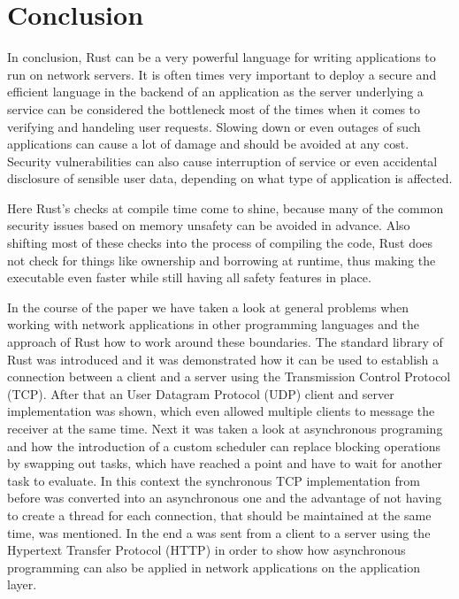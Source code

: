 
\section{Conclusion}
In conclusion, Rust can be a very powerful language for writing applications to run on network servers. It is often
times very important to deploy a secure and efficient language in the backend of an application as the server
underlying a service can be considered the bottleneck most of the times when it comes to verifying and handeling user
requests. Slowing down or even outages of such applications can cause a lot of damage and should be avoided at any
cost. Security vulnerabilities can also cause interruption of service or even accidental disclosure of sensible user
data, depending on what type of application is affected.

Here Rust's checks at compile time come to shine, because many of the common security issues based on memory unsafety
can be avoided in advance. Also shifting most of these checks into the process of compiling the code, Rust does not
check for things like ownership and borrowing at runtime, thus making the executable even faster while still having
all safety features in place.

In the course of the paper we have taken a look at general problems when working with network applications in other
programming languages and the approach of Rust how to work around these boundaries. The standard library of Rust was
introduced and it was demonstrated how it can be used to establish a connection between a client and a server using the
Transmission Control Protocol (TCP). After that an User Datagram Protocol (UDP) client and server implementation was
shown, which even allowed multiple clients to message the receiver at the same time. Next it was taken a look at
asynchronous programing and how the introduction of a custom scheduler can replace blocking operations by swapping
out tasks, which have reached a  point and have to wait for another task to evaluate. In this context the
synchronous TCP implementation from before was converted into an asynchronous one and the advantage of not having to
create a thread for each connection, that should be maintained at the same time, was mentioned. In the end a
 was sent from a client to a server using the Hypertext Transfer Protocol (HTTP) in order to show how
asynchronous programming can also be applied in network applications on the application layer.

